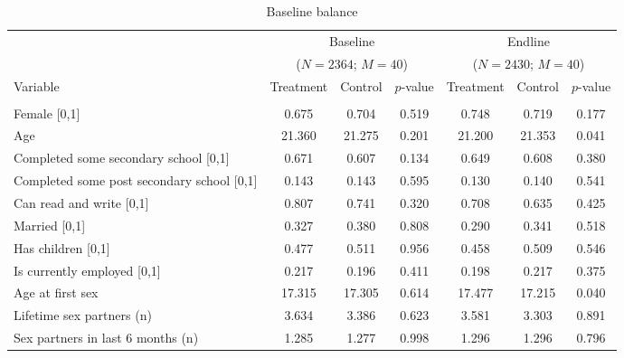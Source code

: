 \begin{table}

\caption{\label{tab:}Baseline balance}
\centering
\fontsize{9}{11}\selectfont
\begin{tabular}[t]{lcccccc}
\toprule
\multicolumn{1}{c}{ } & \multicolumn{3}{c}{Baseline} & \multicolumn{3}{c}{Endline} \\
\multicolumn{1}{c}{ } & \multicolumn{3}{c}{($N = 2364$; $M = 40$)} & \multicolumn{3}{c}{($N = 2430$; $M = 40$)} \\
\cmidrule(l{3pt}r{3pt}){2-4} \cmidrule(l{3pt}r{3pt}){5-7}
Variable & Treatment & Control & $p$-value & Treatment & Control & $p$-value\\
\midrule
\rowcolor{gray!6}  \addlinespace[0.3em]
\multicolumn{7}{l}{\textit{Socio-demographic controls}}\\
\hspace{1em}Female [0,1] & 0.675 & 0.704 & 0.519 & 0.748 & 0.719 & 0.177\\
\hspace{1em}Age & 21.360 & 21.275 & 0.201 & 21.200 & 21.353 & 0.041\\
\rowcolor{gray!6}  \hspace{1em}Completed some secondary school [0,1] & 0.671 & 0.607 & 0.134 & 0.649 & 0.608 & 0.380\\
\hspace{1em}Completed some post secondary school [0,1] & 0.143 & 0.143 & 0.595 & 0.130 & 0.140 & 0.541\\
\rowcolor{gray!6}  \hspace{1em}Can read and write [0,1] & 0.807 & 0.741 & 0.320 & 0.708 & 0.635 & 0.425\\
\hspace{1em}Married [0,1] & 0.327 & 0.380 & 0.808 & 0.290 & 0.341 & 0.518\\
\rowcolor{gray!6}  \hspace{1em}Has children [0,1] & 0.477 & 0.511 & 0.956 & 0.458 & 0.509 & 0.546\\
\hspace{1em}Is currently employed [0,1] & 0.217 & 0.196 & 0.411 & 0.198 & 0.217 & 0.375\\
\rowcolor{gray!6}  \hspace{1em}Age at first sex & 17.315 & 17.305 & 0.614 & 17.477 & 17.215 & 0.040\\
\hspace{1em}Lifetime sex partners (n) & 3.634 & 3.386 & 0.623 & 3.581 & 3.303 & 0.891\\
\rowcolor{gray!6}  \hspace{1em}Sex partners in last 6 months (n) & 1.285 & 1.277 & 0.998 & 1.296 & 1.296 & 0.796\\

\end{tabular}
\end{table}

